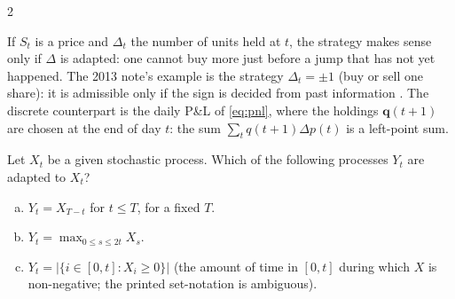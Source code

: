 \begin{paracol}{2}
\begin{finance}
If $S_t$ is a price and $\Delta_t$ the number of units held at $t$, the strategy makes sense only if $\Delta$ is adapted: one cannot
buy more just before a jump that has not yet happened. The 2013 note's example is the strategy $\Delta_t=\pm1$ (buy or sell one
share): it is admissible only if the sign is decided from past information . The discrete counterpart is the
daily P\&L of \cref{eq:pnl}, where the holdings $\bm q(t+1)$ are chosen at the end of day $t$: the
sum $\sum_tq(t+1)\Delta p(t)$ is a left-point sum.
\end{finance}

\begin{exercise}\label{ch17:ex-a3}
Let $X_t$ be a given stochastic process. Which of the following processes $Y_t$ are adapted to $X_t$?
\begin{enumerate}[(a)]
  \item $Y_t=X_{T-t}$ for $t\le T$, for a fixed $T$.
  \item $Y_t=\max_{0\le s\le2t}X_s$.
  \item $Y_t=|\{i\in[0,t]:X_i\ge0\}|$ (the amount of time in $[0,t]$ during which $X$ is non-negative; the printed set-notation is ambiguous).
\end{enumerate}
\end{exercise}


\end{paracol}
